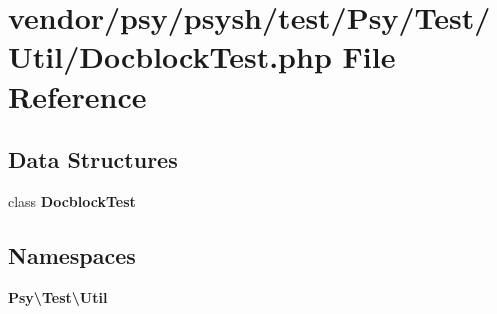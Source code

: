 \section{vendor/psy/psysh/test/\+Psy/\+Test/\+Util/\+Docblock\+Test.php File Reference}
\label{psy_2psysh_2test_2_psy_2_test_2_util_2_doc_block_test_8php}
\subsection*{Data Structures}
\begin{DoxyCompactItemize}
\item 
class {\bf Docblock\+Test}
\end{DoxyCompactItemize}
\subsection*{Namespaces}
\begin{DoxyCompactItemize}
\item 
 {\bf Psy\textbackslash{}\+Test\textbackslash{}\+Util}
\end{DoxyCompactItemize}
